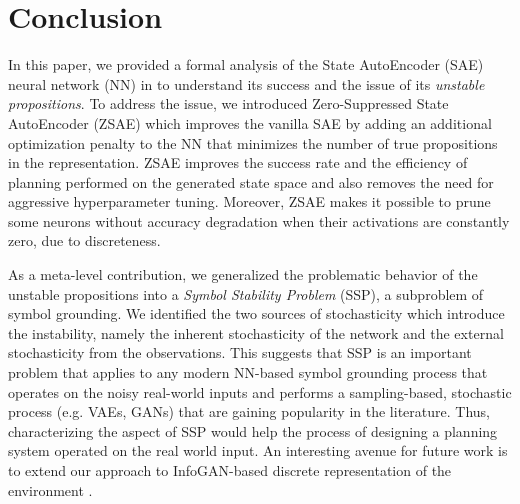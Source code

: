 \section{Conclusion}
\label{conclusion}

In this paper, we provided a formal analysis of the State AutoEncoder
(SAE) neural network (NN) in \latentplanner \cite{Asai2018} to
understand its success and 
the issue of its \emph{unstable propositions}.
% 
To address the issue,
we introduced Zero-Suppressed State AutoEncoder (ZSAE) which
improves the vanilla SAE by
adding an additional optimization penalty to the NN
that minimizes the number of true propositions in the representation.
% 
ZSAE improves the success rate and the efficiency of planning performed on
the generated state space and
also removes the need for aggressive hyperparameter tuning.
% 
Moreover, 
ZSAE makes it possible to prune some neurons without accuracy degradation
when their activations are constantly zero, due to discreteness.

As a meta-level contribution,
we generalized the problematic behavior of the unstable propositions
into a \emph{Symbol Stability Problem} (SSP), a subproblem of symbol grounding.
% 
We identified the two sources of stochasticity which introduce the instability,
namely
the inherent stochasticity of the network and
the external stochasticity from the observations.
% 
This suggests that
SSP is an important problem that applies to any modern NN-based symbol grounding process
that operates on the noisy real-world inputs and
performs a sampling-based, stochastic process (e.g. VAEs, GANs) that are gaining popularity in the literature.
Thus, characterizing the aspect of SSP would help the process of designing a planning system operated on the real world input.
An interesting avenue for future work is to extend our approach to InfoGAN-based
discrete representation of the environment \cite{kurutach2018learning}.
